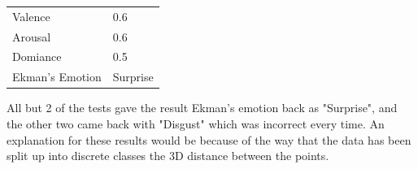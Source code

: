 \begin{table}[h]
\centering
\begin{tabular}{|l|l|}
\hline
 Valence &  0.6\\
 Arousal &  0.6\\
 Domiance &  0.5\\
 Ekman's Emotion &  Surprise\\ \hline
\end{tabular}
\end{table}

All but 2 of the tests gave the result Ekman's emotion back as "Surprise", and the other two came back with "Disgust" which was incorrect every time. An explanation for these results would be because of the way that the data has been split up into discrete classes the 3D distance between the points.
